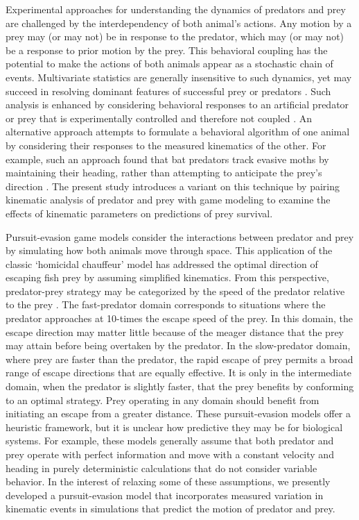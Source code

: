 \documentclass[]{rsos}%
\begin{document}
Experimental approaches for understanding the dynamics of predators and prey are challenged by the interdependency of both animal's actions.
Any motion by a prey may (or may not) be in response to the predator, which may (or may not) be a response to prior motion by the prey. 
This behavioral coupling has the potential to make the actions of both animals appear as a stochastic chain of events.
Multivariate statistics are generally insensitive to such dynamics, yet may succeed in resolving dominant features of successful prey \cite{Walker:2005vn} or predators \cite{Wainwright:2001ufa}.
Such analysis is enhanced by considering behavioral responses to an artificial predator or prey that is experimentally controlled and therefore not coupled \cite{Gabbiani:1999wz,Stewart:2014cma,Heuch:2007kk}.
An alternative approach attempts to formulate a behavioral algorithm of one animal by considering their responses to the measured kinematics of the other.
For example, such an approach found that bat predators track evasive moths by maintaining their heading, rather than attempting to anticipate the prey's direction \cite{Ghose:2006dk}. 
The present study introduces a variant on this technique by pairing kinematic analysis of predator and prey with game modeling to examine the effects of kinematic parameters on predictions of prey survival.

Pursuit-evasion game models consider the interactions between predator and prey by simulating how both animals move through space.
This application of the classic `homicidal chauffeur' model \cite{Isaacs:1965uz} has addressed the optimal direction of escaping fish prey \cite{Weihs:1984tb} by assuming simplified kinematics.
From this perspective, predator-prey strategy may be categorized by the speed of the predator relative to the prey \cite{Soto:2015cj}. 
The fast-predator domain corresponds to situations where the predator approaches at 10-times the escape speed of the prey.
In this domain, the escape direction may matter little because of the meager distance that the prey may attain before being overtaken by the predator.
In the slow-predator domain, where prey are faster than the predator, the rapid escape of prey permits a broad range of escape directions that are equally effective.
It is only in the intermediate domain, when the predator is slightly faster, that the prey benefits by conforming to an optimal strategy.
Prey operating in any domain should benefit from initiating an escape from a greater distance.
These pursuit-evasion models offer a heuristic framework, but it is unclear how predictive they may be for biological systems. 
For example, these models generally assume that both predator and prey operate with perfect information and move with a constant velocity and heading in purely deterministic calculations that do not consider variable behavior.
In the interest of relaxing some of these assumptions, we presently developed a pursuit-evasion model that incorporates measured variation in kinematic events in simulations that predict the motion of predator and prey. 
\end{document}
